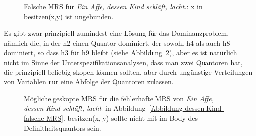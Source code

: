 \begin{figure}

\caption{Falsche MRS für \emph{Ein Affe, dessen Kind schläft, lacht.}: x in besitzen(x,y) ist ungebunden.}\label{Abbildung dessen Kind-falsch}
\end{figure}

Es gibt zwar prinzipiell zumindest eine Lösung für das Dominanzproblem, nämlich die, in der h2 einen
Quantor dominiert, der sowohl h4 als auch h8 dominiert, so dass h3 für h9 bleibt (siehe
Abbildung~\ref{Abbildung dessen Kind-falsch-geskopt}), aber es ist natürlich nicht im Sinne der
Unterspezifikationsanalysen, dass man zwei Quantoren hat, die prinzipiell beliebig skopen können
sollten, aber durch ungünstige Verteilungen von Variablen nur eine Abfolge der Quantoren zulassen.

\begin{figure}

\caption{Mögliche geskopte MRS für die fehlerhafte MRS von \emph{Ein Affe, dessen Kind schläft,
    lacht.} in Abbildung~\ref{Abbildung dessen Kind-falsche-MRS}. besitzen(x, y) sollte nicht mit im
Body des Definitheitsquantors sein.}\label{Abbildung dessen Kind-falsch-geskopt}
\end{figure}


